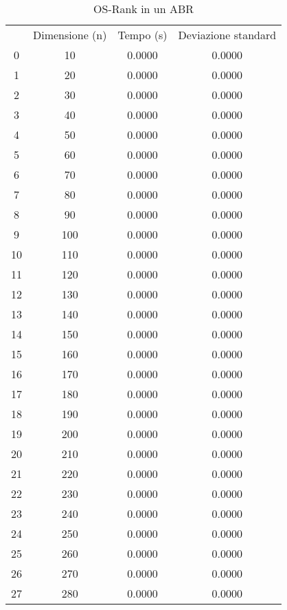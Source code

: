 \begin{table}
\centering
\caption{OS-Rank in un ABR}
\label{OS-Rank in un ABR}
\begin{adjustbox}{width=1\textwidth/2}
\begin{tabular}{|c|c|c|c|}
\hline
 & Dimensione (n) & Tempo (s) & Deviazione standard \\
0 & 10 & 0.0000 & 0.0000 \\
\cline{1-4}
1 & 20 & 0.0000 & 0.0000 \\
\cline{1-4}
2 & 30 & 0.0000 & 0.0000 \\
\cline{1-4}
3 & 40 & 0.0000 & 0.0000 \\
\cline{1-4}
4 & 50 & 0.0000 & 0.0000 \\
\cline{1-4}
5 & 60 & 0.0000 & 0.0000 \\
\cline{1-4}
6 & 70 & 0.0000 & 0.0000 \\
\cline{1-4}
7 & 80 & 0.0000 & 0.0000 \\
\cline{1-4}
8 & 90 & 0.0000 & 0.0000 \\
\cline{1-4}
9 & 100 & 0.0000 & 0.0000 \\
\cline{1-4}
10 & 110 & 0.0000 & 0.0000 \\
\cline{1-4}
11 & 120 & 0.0000 & 0.0000 \\
\cline{1-4}
12 & 130 & 0.0000 & 0.0000 \\
\cline{1-4}
13 & 140 & 0.0000 & 0.0000 \\
\cline{1-4}
14 & 150 & 0.0000 & 0.0000 \\
\cline{1-4}
15 & 160 & 0.0000 & 0.0000 \\
\cline{1-4}
16 & 170 & 0.0000 & 0.0000 \\
\cline{1-4}
17 & 180 & 0.0000 & 0.0000 \\
\cline{1-4}
18 & 190 & 0.0000 & 0.0000 \\
\cline{1-4}
19 & 200 & 0.0000 & 0.0000 \\
\cline{1-4}
20 & 210 & 0.0000 & 0.0000 \\
\cline{1-4}
21 & 220 & 0.0000 & 0.0000 \\
\cline{1-4}
22 & 230 & 0.0000 & 0.0000 \\
\cline{1-4}
23 & 240 & 0.0000 & 0.0000 \\
\cline{1-4}
24 & 250 & 0.0000 & 0.0000 \\
\cline{1-4}
25 & 260 & 0.0000 & 0.0000 \\
\cline{1-4}
26 & 270 & 0.0000 & 0.0000 \\
\cline{1-4}
27 & 280 & 0.0000 & 0.0000 \\

\end{tabular}
\end{adjustbox}
\end{table}
